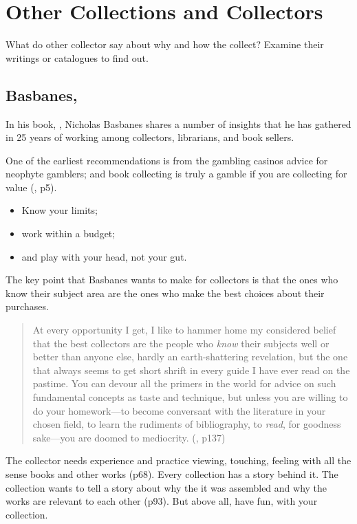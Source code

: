 \documentclass[letterpaper]{article}
\begin{document}
\section{Other Collections and Collectors}

What do other collector say about why and how the collect? Examine
their writings or catalogues to find out.

\subsection{Basbanes, }

In his book, , Nicholas Basbanes shares a number
of insights that he has gathered in 25 years of working among collectors,
librarians, and book sellers.

One of the earliest recommendations is from the gambling casinos
advice for neophyte gamblers; and book collecting is truly a gamble
if you are collecting for value (\cite{Basbanes2002}, p5).

\begin{itemize}
\item Know your limits;
\item work within a budget;
\item and play with your head, not your gut.
\end{itemize}

The key point that Basbanes wants to make for collectors is that
the ones who know their subject area are the ones who make
the best choices about their purchases.

\begin{quotation}
  At every opportunity I get, I like to hammer home my considered
  belief that the best collectors are the people who {\itshape know}
  their subjects well or better than anyone else, hardly an
  earth-shattering revelation, but the one that always seems to get
  short shrift in every guide I have ever read on the pastime.
  You can devour all the primers in the world for advice on
  such fundamental concepts as taste and technique, but unless
  you are willing to do your homework---to become conversant
  with the literature in your chosen field, to learn the rudiments
  of bibliography, to {\itshape read}, for goodness sake---you are
  doomed to mediocrity. (\cite{Basbanes2002}, p137)
\end{quotation}

The collector needs experience and practice viewing, touching, feeling
with all the sense books and other works (p68). Every collection has a
story behind it. The collection wants to tell a story about why the
it was assembled and why the works are relevant to each other (p93).
But above all, have fun, with your collection.
\end{document}
